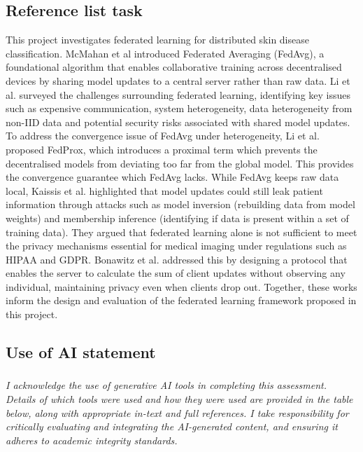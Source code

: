 \documentclass[12pt]{article}
\begin{document}
\subsection*{Reference list task}
This project investigates federated learning for distributed skin disease classification. McMahan et al \cite{mcmahanCommunicationEfficientLearningDeep2023} introduced Federated Averaging (FedAvg), a foundational algorithm that enables collaborative training across decentralised devices by sharing model updates to a central server rather than raw data. Li et al. \cite{liFederatedLearningChallenges2020} surveyed the challenges surrounding federated learning, identifying key issues such as expensive communication, system heterogeneity, data heterogeneity from non-IID data and potential security risks associated with shared model updates. To address the convergence issue of FedAvg under heterogeneity, Li et al. \cite{liFederatedOptimizationHeterogeneous2020} proposed FedProx, which introduces a proximal term which prevents the decentralised models from deviating too far from the global model. This provides the convergence guarantee which FedAvg lacks. While FedAvg keeps raw data local, Kaissis et al. \cite{kaissisSecurePrivacypreservingFederated2020} highlighted that model updates could still leak patient information through attacks such as model inversion (rebuilding data from model weights) and membership inference (identifying if data is present within a set of training data). They argued that federated learning alone is not sufficient to meet the privacy mechanisms essential for medical imaging under regulations such as HIPAA and GDPR. Bonawitz et al. \cite{bonawitzPracticalSecureAggregation2017} addressed this by designing a protocol that enables the server to calculate the sum of client updates without observing any individual, maintaining privacy even when clients drop out. Together, these works inform the design and evaluation of the federated learning framework proposed in this project.

\vspace{6em}




\subsection*{Use of AI statement}
\subsubsection*{}
\noindent \textit{I acknowledge the use of generative AI tools in completing this assessment. Details of which tools were used and how they were used are provided in the table below, along with appropriate in-text and full references. I take responsibility for critically evaluating and integrating the AI-generated content, and ensuring it adheres to academic integrity standards.}
\end{document}
